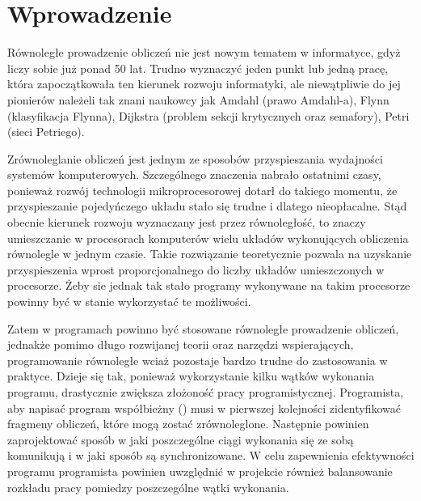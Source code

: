 
\chapter*{Wprowadzenie}

  Równoległe prowadzenie obliczeń nie jest nowym tematem w informatyce, gdyż liczy sobie już ponad 50 lat\cite{parhist}.
  Trudno wyznaczyć jeden punkt lub jedną pracę, która zapoczątkowała ten kierunek rozwoju informatyki, ale niewątpliwie do jej pionierów należeli tak znani naukowcy jak
  Amdahl (prawo Amdahl-a), Flynn (klasyfikacja Flynna), Dijkstra (problem sekcji krytycznych oraz semafory), Petri (sieci Petriego).
  
  Zrównoleglanie obliczeń jest jednym ze sposobów przyspieszania wydajności systemów komputerowych.
  Szczególnego znaczenia nabrało ostatnimi czasy, ponieważ rozwój technologii mikroprocesorowej dotarł do takiego momentu, że przyspieszanie pojedyńczego układu stało się trudne i dlatego nieopłacalne.
  Stąd obecnie kierunek rozwoju wyznaczany jest przez równoległość, to znaczy umieszczanie w procesorach komputerów wielu układów wykonujących obliczenia równolegle w jednym czasie.
  Takie rozwiązanie teoretycznie pozwala na uzyskanie przyspieszenia wprost proporcjonalnego do liczby układów umieszczonych w procesorze.
  Żeby sie jednak tak stało programy wykonywane na takim procesorze powinny być w stanie wykorzystać te możliwości.
  
  Zatem w programach powinno być stosowane równoległe prowadzenie obliczeń, jednakże pomimo długo rozwijanej teorii oraz narzędzi wspierających, programowanie równoległe wciaż pozostaje bardzo trudne do zastosowania w praktyce.
  Dzieje się tak, ponieważ wykorzystanie kilku wątków wykonania programu, drastycznie zwiększa złożoność pracy programistycznej.
  Programista, aby napisać program współbieżny (\cite{barney}) musi w pierwszej kolejności zidentyfikować fragmeny obliczeń, które mogą zostać zrównoleglone.
  Następnie powinien zaprojektować sposób w jaki poszczególne ciągi wykonania się ze sobą komunikują i w jaki sposób są synchronizowane.
  W celu zapewnienia efektywności programu programista powinien uwzględnić w projekcie również balansowanie rozkładu pracy pomiedzy poszczególne wątki wykonania.
  
